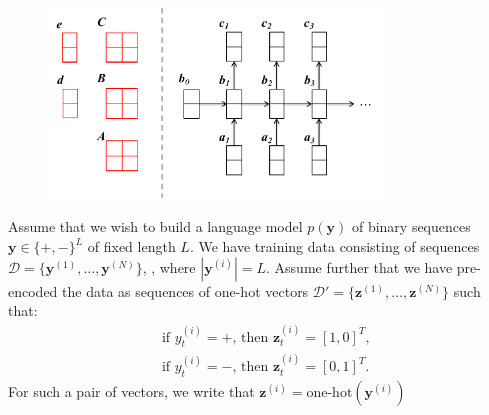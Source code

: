 \documentclass[11pt,addpoints,answers]{exam}
\numberwithin{equation}{section} %
\numberwithin{figure}{section} %
\numberwithin{table}{section} %
\newcommand{\Dc}{\mathcal{D}}
\newcommand{\yv}{\mathbf{y}}
\newcommand{\zv}{\mathbf{z}}
\begin{document}
\begin{figure}[H]
    \centering
    \includegraphics[width=0.8\textwidth]{fig/hw1_rnn.pdf}
    \caption{}
    \label{fig:rnnlm}
\end{figure}
%
Assume that we wish to build a language model $p(\yv)$ of binary sequences $\yv \in \{ +, - \}^L$ of fixed length $L$. We have training data consisting of sequences $\Dc = \{ \yv^{(1)}, \ldots, \yv^{(N)} \}$, , where $|\yv^{(i)}| = L$. Assume further that we have pre-encoded the data as sequences of one-hot vectors $\Dc' = \{ \zv^{(1)}, \ldots, \zv^{(N)} \}$ such that:
\begin{align*}
    & \text{ if $y^{(i)}_t = +$, then $\zv^{(i)}_t = [1, 0]^T$, } \\
    & \text{ if $y^{(i)}_t = -$, then $\zv^{(i)}_t = [0, 1]^T$. }
\end{align*}
For such a pair of vectors, we write that $\zv^{(i)} = \text{one-hot}(\yv^{(i)})$
%
\end{document}
